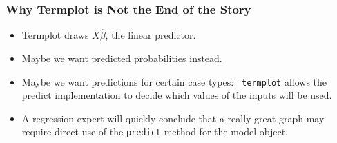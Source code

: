 \documentclass[10pt,english]{beamer}
\begin{document}
\begin{frame}[containsverbatim]
  \frametitle {Why Termplot is Not the End of the Story}
  \begin{itemize}
  \item Termplot draws $X\hat{\beta}$, the linear predictor.
  \item Maybe we want predicted probabilities instead.
  \item Maybe we want predictions for certain case types: \texttt{ termplot} allows the predict implementation to decide which
    values of the inputs will be used.
  \item A regression expert will quickly conclude that a really
    great graph may require direct use of the \texttt{predict}
    method for the model object.
  \end{itemize}
\end{frame}











\end{document}
